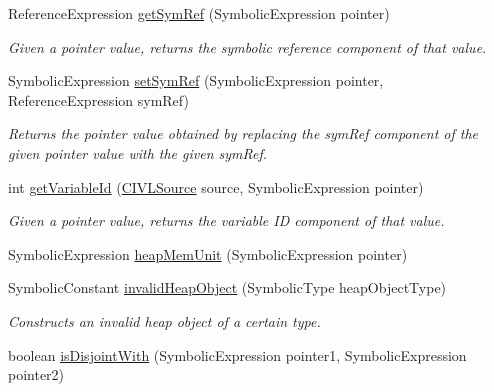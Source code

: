 \begin{DoxyCompactItemize}
Reference\+Expression \hyperlink{interfaceedu_1_1udel_1_1cis_1_1vsl_1_1civl_1_1dynamic_1_1IF_1_1SymbolicUtility_a911d8ffa48b7515cd23b225280f41967}{get\+Sym\+Ref} (Symbolic\+Expression pointer)
\begin{DoxyCompactList}\small\item\em Given a pointer value, returns the symbolic reference component of that value. \end{DoxyCompactList}\item 
Symbolic\+Expression \hyperlink{interfaceedu_1_1udel_1_1cis_1_1vsl_1_1civl_1_1dynamic_1_1IF_1_1SymbolicUtility_a5e3382dcf9ee49c403fe92496532c8d6}{set\+Sym\+Ref} (Symbolic\+Expression pointer, Reference\+Expression sym\+Ref)
\begin{DoxyCompactList}\small\item\em Returns the pointer value obtained by replacing the sym\+Ref component of the given pointer value with the given sym\+Ref. \end{DoxyCompactList}\item 
int \hyperlink{interfaceedu_1_1udel_1_1cis_1_1vsl_1_1civl_1_1dynamic_1_1IF_1_1SymbolicUtility_a0ed54e898812f189f5ef7816dd74ef32}{get\+Variable\+Id} (\hyperlink{interfaceedu_1_1udel_1_1cis_1_1vsl_1_1civl_1_1model_1_1IF_1_1CIVLSource}{C\+I\+V\+L\+Source} source, Symbolic\+Expression pointer)
\begin{DoxyCompactList}\small\item\em Given a pointer value, returns the variable I\+D component of that value. \end{DoxyCompactList}\item 
Symbolic\+Expression \hyperlink{interfaceedu_1_1udel_1_1cis_1_1vsl_1_1civl_1_1dynamic_1_1IF_1_1SymbolicUtility_a9b37893cff12adb1b49d94660d45a856}{heap\+Mem\+Unit} (Symbolic\+Expression pointer)
\item 
Symbolic\+Constant \hyperlink{interfaceedu_1_1udel_1_1cis_1_1vsl_1_1civl_1_1dynamic_1_1IF_1_1SymbolicUtility_abf1291e97e5bc4445343ccb25f718907}{invalid\+Heap\+Object} (Symbolic\+Type heap\+Object\+Type)
\begin{DoxyCompactList}\small\item\em Constructs an invalid heap object of a certain type. \end{DoxyCompactList}\item 
boolean \hyperlink{interfaceedu_1_1udel_1_1cis_1_1vsl_1_1civl_1_1dynamic_1_1IF_1_1SymbolicUtility_acdda7f972cb27bdce430a5e662bfe44e}{is\+Disjoint\+With} (Symbolic\+Expression pointer1, Symbolic\+Expression pointer2)

\end{DoxyCompactItemize}
